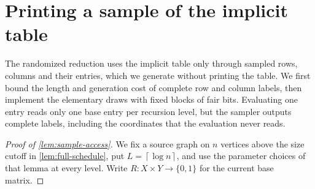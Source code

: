 \documentclass[11pt,letterpaper]{article} \usepackage[utf8]{inputenc}
\theoremstyle{plain} \newtheorem{theorem}{Theorem}[section]
\theoremstyle{definition} \newaliascnt{definition}{theorem}
\newcommand{\ceil}[1]{\left\lceil#1\right\rceil}
\begin{document}
\section{Printing a sample of the implicit table}\label{sec:sampling-algorithm}
\label{app:implementation}

The randomized reduction uses the implicit table only through sampled rows,
columns and their entries, which we generate without printing the table. We
first bound the length and generation cost of complete row and column labels,
then implement the elementary draws with fixed blocks of fair bits. Evaluating
one entry reads only one base entry per recursion level, but the sampler
outputs complete labels, including the coordinates that the evaluation never reads.

\begin{proof}[Proof of \cref{lem:sample-access}]
\label{proof:lem:sample-access}
We fix a source graph on $n$ vertices above the size cutoff in \cref{lem:full-schedule}, put $L=\ceil{\log n}$, and use the parameter choices of that lemma at
every level. Write $R:X\times Y\to\{0,1\}$ for the current base matrix.


\end{proof}
\end{document}
